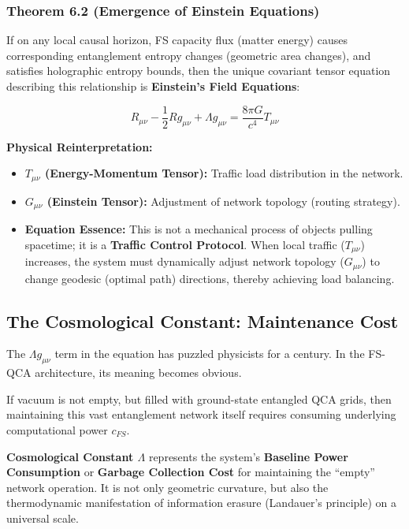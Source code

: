 \documentclass[11pt,a4paper,twoside]{book}
\begin{document}
\subsubsection{Theorem 6.2 (Emergence of Einstein Equations)}

If on any local causal horizon, FS capacity flux (matter energy) causes corresponding entanglement entropy changes (geometric area changes), and satisfies holographic entropy bounds, then the unique covariant tensor equation describing this relationship is \textbf{Einstein's Field Equations}:

$$R_{\mu\nu} - \frac{1}{2}Rg_{\mu\nu} + \Lambda g_{\mu\nu} = \frac{8\pi G}{c^4} T_{\mu\nu}$$

\textbf{Physical Reinterpretation:}

\begin{itemize}
\item \textbf{$T_{\mu\nu}$ (Energy-Momentum Tensor):} Traffic load distribution in the network.

\item \textbf{$G_{\mu\nu}$ (Einstein Tensor):} Adjustment of network topology (routing strategy).

\item \textbf{Equation Essence:} This is not a mechanical process of objects pulling spacetime; it is a \textbf{Traffic Control Protocol}. When local traffic ($T_{\mu\nu}$) increases, the system must dynamically adjust network topology ($G_{\mu\nu}$) to change geodesic (optimal path) directions, thereby achieving load balancing.
\end{itemize}

\subsection{The Cosmological Constant: Maintenance Cost}

The $\Lambda g_{\mu\nu}$ term in the equation has puzzled physicists for a century. In the FS-QCA architecture, its meaning becomes obvious.

If vacuum is not empty, but filled with ground-state entangled QCA grids, then maintaining this vast entanglement network itself requires consuming underlying computational power $c_{FS}$.

\textbf{Cosmological Constant $\Lambda$} represents the system's \textbf{Baseline Power Consumption} or \textbf{Garbage Collection Cost} for maintaining the ``empty'' network operation. It is not only geometric curvature, but also the thermodynamic manifestation of information erasure (Landauer's principle) on a universal scale.
\end{document}

